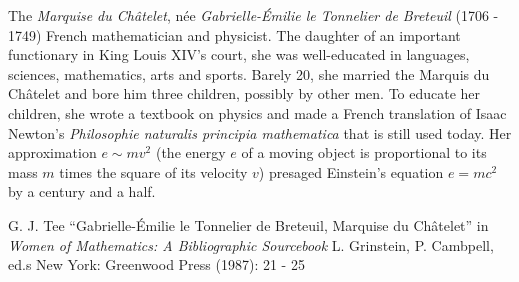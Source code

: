 \documentclass[12pt]{article}
\begin{document}
The \emph{Marquise du Ch\^atelet}, n\'ee \emph{Gabrielle-\'Emilie le Tonnelier de Breteuil} (1706 - 1749) French mathematician and physicist. The daughter of an important functionary in King Louis XIV's court, she was well-educated in languages, sciences, mathematics, arts and sports. Barely 20, she married the Marquis du Ch\^atelet and bore him three children, possibly by other men. To educate her children, she wrote a textbook on physics and made a French translation of Isaac Newton's {\it Philosophie naturalis principia mathematica} that is still used today. Her approximation $e \sim mv^2$ (the energy $e$ of a moving object is proportional to its mass $m$ times the square of its velocity $v$) presaged Einstein's equation $e = mc^2$ by a century and a half.

\begin{thebibliography}{1}
 G. J. Tee ``Gabrielle-\'Emilie le Tonnelier de Breteuil, Marquise du Ch\^atelet'' in {\it Women of Mathematics: A Bibliographic Sourcebook} L. Grinstein, P. Cambpell, ed.s New York: Greenwood Press (1987): 21 - 25
\end{thebibliography}
\end{document}
